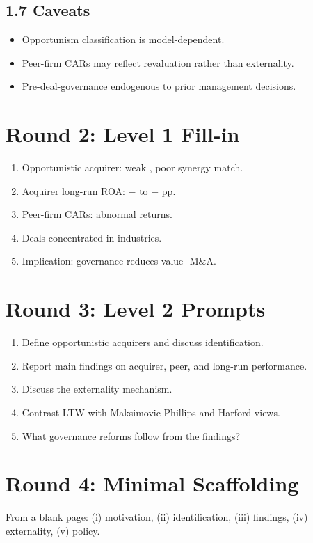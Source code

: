 \documentclass[11pt]{article}
\newcommand{\blank}[1]{\underline{\hspace{#1}}}
\begin{document}
\subsection*{1.7 Caveats}
\begin{alertbox}
\begin{itemize}
\item Opportunism classification is model-dependent.
\item Peer-firm CARs may reflect revaluation rather than externality.
\item Pre-deal-governance endogenous to prior management decisions.
\end{itemize}
\end{alertbox}

\section*{Round 2: Level 1 Fill-in}
\begin{enumerate}
\item Opportunistic acquirer: weak \blank{2cm}, poor synergy match.
\item Acquirer long-run ROA: $-$\blank{1cm} to $-$\blank{1cm} pp.
\item Peer-firm CARs: \blank{1cm} abnormal returns.
\item Deals concentrated in \blank{2cm} industries.
\item Implication: governance reduces value-\blank{2cm} M\&A.
\end{enumerate}

\section*{Round 3: Level 2 Prompts}
\begin{enumerate}
\item Define opportunistic acquirers and discuss identification.
\item Report main findings on acquirer, peer, and long-run performance.
\item Discuss the externality mechanism.
\item Contrast LTW with Maksimovic-Phillips and Harford views.
\item What governance reforms follow from the findings?
\end{enumerate}

\section*{Round 4: Minimal Scaffolding}
From a blank page: (i) motivation, (ii) identification, (iii) findings, (iv) externality, (v) policy.
\end{document}
